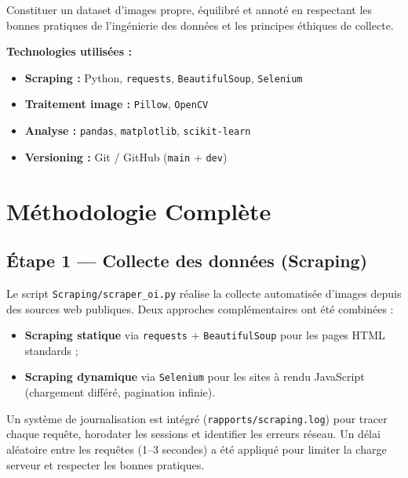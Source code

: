 \documentclass[12pt,a4paper]{article}
\begin{document}
\begin{infobox}
Constituer un dataset d'images propre, équilibré et annoté en respectant les bonnes
pratiques de l'ingénierie des données et les principes éthiques de collecte.
\end{infobox}

\textbf{Technologies utilisées :}
\begin{itemize}[noitemsep]
  \item \textbf{Scraping :} Python, \texttt{requests}, \texttt{BeautifulSoup}, \texttt{Selenium}
  \item \textbf{Traitement image :} \texttt{Pillow}, \texttt{OpenCV}
  \item \textbf{Analyse :} \texttt{pandas}, \texttt{matplotlib}, \texttt{scikit-learn}
  \item \textbf{Versioning :} Git / GitHub (\texttt{main} + \texttt{dev})
\end{itemize}

\section{Méthodologie Complète}

\subsection{Étape 1 — Collecte des données (Scraping)}

Le script \texttt{Scraping/scraper\_oi.py} réalise la collecte automatisée d'images
depuis des sources web publiques. Deux approches complémentaires ont été combinées :

\begin{itemize}
  \item \textbf{Scraping statique} via \texttt{requests} + \texttt{BeautifulSoup}
        pour les pages HTML standards ;
  \item \textbf{Scraping dynamique} via \texttt{Selenium} pour les sites à rendu
        JavaScript (chargement différé, pagination infinie).
\end{itemize}

Un système de journalisation est intégré (\texttt{rapports/scraping.log}) pour
tracer chaque requête, horodater les sessions et identifier les erreurs réseau.
Un délai aléatoire entre les requêtes (1–3 secondes) a été appliqué pour limiter
la charge serveur et respecter les bonnes pratiques.
\end{document}
